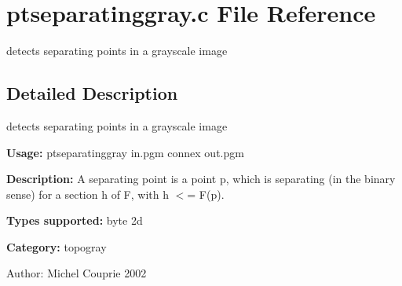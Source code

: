 \section{ptseparatinggray.c File Reference}
\label{ptseparatinggray_8c}
detects separating points in a grayscale image 



\subsection{Detailed Description}
detects separating points in a grayscale image 

{\bf Usage:} ptseparatinggray in.pgm connex out.pgm

{\bf Description:} A separating point is a point p, which is separating (in the binary sense) for a section h of F, with h $<$= F(p).

{\bf Types supported:} byte 2d

{\bf Category:} topogray

\begin{Desc}
\item[Author:]Michel Couprie 2002 \end{Desc}
